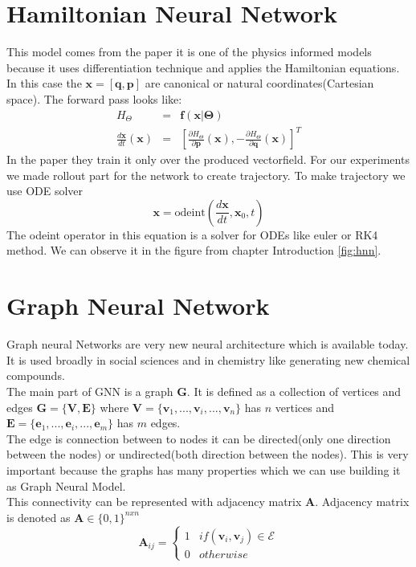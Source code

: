 \section{Hamiltonian Neural Network}
This model comes from the paper \cite{hnn} it is one of the physics informed models because it uses differentiation technique and applies the Hamiltonian equations. In this case the $\mathbf{x} = [\mathbf{q},\mathbf{p}]$ are canonical or natural coordinates(Cartesian space).
The forward pass looks like:
\begin{eqnarray}
	H_{\Theta} &=& \mathbf{f}(\mathbf{x}|\boldsymbol{\Theta})\\
	\frac{d\mathbf{x}}{dt}(\mathbf{x}) &=& \left[\frac{\partial H_{\Theta}}{\partial\mathbf{p}}(\mathbf{x}),-\frac{\partial H_{\Theta}}{\partial\mathbf{q}}(\mathbf{x})\right]^T
\end{eqnarray}
In the paper they train it only over the produced vectorfield.
For our experiments we made rollout part for the network to create trajectory. 
To make trajectory we use ODE solver
\begin{equation}
	\mathbf{x} = \text{odeint}\left(\frac{d\mathbf{x}}{dt},\mathbf{x}_0,t\right)
\end{equation} 
The odeint operator in this equation is a solver for ODEs like euler or RK4 method. We can observe it in the figure from chapter Introduction \ref{fig:hnn}.\\
\section{Graph Neural Network}
Graph neural Networks are very new neural architecture which is available today. It is used broadly in social sciences and in chemistry like generating new chemical compounds.\\
The main part of GNN is a graph $\mathbf{G}$. It is defined as a collection of vertices and edges $\mathbf{G}=\{\mathbf{V},\mathbf{E}\}$ where $\mathbf{V} = \{\mathbf{v}_1,...,\mathbf{v}_i,...,\mathbf{v}_n\}$ has $n$ vertices
and $\mathbf{E} = \{\mathbf{e}_1,...,\mathbf{e}_i,...,\mathbf{e}_m\}$
has $m$ edges.\\
The edge is connection between to nodes it can be directed(only one direction between the nodes) or undirected(both direction between the nodes). This is very important because the graphs has many properties which we can use building it as Graph Neural Model.\\
This connectivity can be represented with adjacency matrix $\mathbf{A}$.
Adjacency matrix is denoted as $\mathbf{A}\in \{0,1\}^{n x n}$ 
\begin{equation}
\mathbf{A}_{ij} =	\left\{\begin{matrix}
		1 & if (\mathbf{v}_i , \mathbf{v}_j)\in\mathcal{E}\\
		0 & otherwise
	\end{matrix}\right.
\end{equation}

